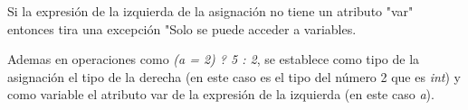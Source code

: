 Si la expresión de la izquierda de la asignación no tiene un atributo "var" entonces tira una excepción "Solo se puede acceder a variables.

Ademas en operaciones como \textit{(a = 2) ? 5 : 2}, se establece como tipo de la asignación el tipo de la derecha (en este caso es el tipo del número 2 que es \textit{int}) y como variable el atributo var de la expresión de la izquierda (en este caso \textit{a}).

